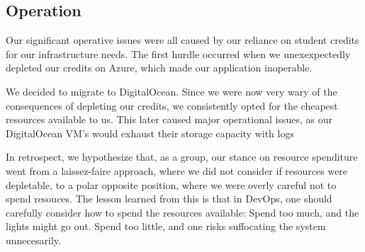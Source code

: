 \subsection{Operation}

Our significant operative issues were all caused by our reliance on student credits for our infrastructure needs.
The first hurdle occurred when we unexexpectedly depleted our credits on Azure,
which made our
application
inoperable.%

We decided to migrate to DigitalOcean.
Since we were now very wary of the consequences of depleting our credits, we consistently opted for the cheapest resources available to us.
This later caused major operational issues, as our DigitalOcean VM's would exhaust their storage capacity with logs%

In retrospect, we hypothesize that, as a group, our stance on resource spenditure went from a laissez-faire approach, where we did not consider if resources were depletable, to a polar opposite position, where we were overly careful not to spend resouces.
The lesson learned from this is that in DevOps, one should carefully consider how to spend the resources available: Spend too much, and the lights might go out. Spend too little, and one risks suffocating the system unnecesarily.


